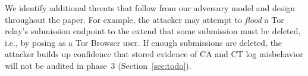 %
%
We identify additional threats that follow from our adversary model and
design throughout the paper.  For example, the attacker may attempt to
\emph{flood} a Tor relay's submission endpoint to the extend that some
submission must be deleted, i.e., by posing as a Tor Browser user.  If enough
submissions are deleted, the attacker builds up confidence that stored evidence
of CA and CT log misbehavior will not be audited in phase~3
(Section~\ref{sec:todo}).
